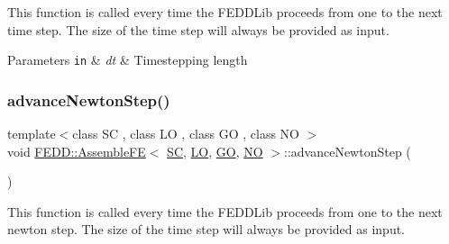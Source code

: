 This function is called every time the F\+E\+D\+D\+Lib proceeds from one to the next time step. The size of the time step will always be provided as input. 


\begin{DoxyParams}[1]{Parameters}
\mbox{\tt in}  & {\em dt} & Timestepping length \\
\hline
\end{DoxyParams}
\mbox{\label{classFEDD_1_1AssembleFE_afbb44e574eb47e8e97436e9125f373a0}} 
\subsubsection{\texorpdfstring{advance\+Newton\+Step()}{advanceNewtonStep()}}
{\footnotesize\ttfamily template$<$class SC , class LO , class GO , class NO $>$ \\
void \hyperlink{classFEDD_1_1AssembleFE}{F\+E\+D\+D\+::\+Assemble\+FE}$<$ \hyperlink{fe__test__laplace_8cpp_a79c7e86a57edbb2a5a53242bcd04e41e}{SC}, \hyperlink{fe__test__laplace_8cpp_ad6a38c9f07d3fd633eefca5bccad8410}{LO}, \hyperlink{fe__test__laplace_8cpp_afa2946b509009b4f45eb04bd8c5b27d9}{GO}, \hyperlink{fe__test__laplace_8cpp_a5e24f37b28787429872b6ecb1d0417ce}{NO} $>$\+::advance\+Newton\+Step (\begin{DoxyParamCaption}{ }\end{DoxyParamCaption})}



This function is called every time the F\+E\+D\+D\+Lib proceeds from one to the next newton step. The size of the time step will always be provided as input. 

\mbox{\label{classFEDD_1_1AssembleFE_af48b450dfdf6cea7beeb24feef7dc10f}} 
